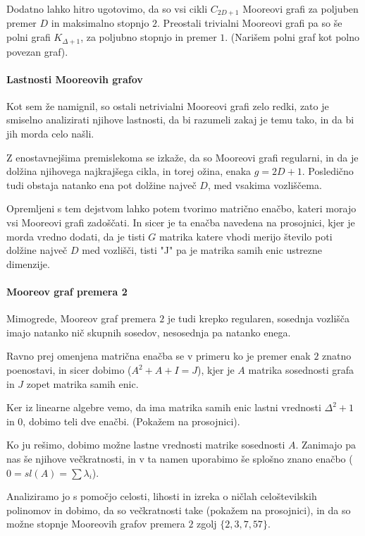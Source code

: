 \documentclass{fmfkpb}
\begin{document}
Dodatno lahko hitro ugotovimo, da so vsi cikli $C_{2D + 1}$ Mooreovi grafi 
za poljuben premer $D$ in maksimalno stopnjo $2$.
Preostali trivialni Mooreovi grafi pa so še polni grafi $K_{\Delta + 1}$, 
za poljubno stopnjo in premer $1$. (Narišem polni graf kot polno povezan graf).

\paragraph{Lastnosti Mooreovih grafov}
Kot sem že namignil, so ostali netrivialni Mooreovi grafi zelo redki, 
zato je smiselno analizirati njihove lastnosti, da bi razumeli zakaj je temu
tako, in da bi jih morda celo našli.

Z enostavnejšima premislekoma se izkaže, da so Mooreovi grafi regularni,
in da je dolžina njihovega najkrajšega cikla, in torej ožina, enaka $g=2D+1$.
Posledično tudi obstaja natanko ena pot dolžine največ $D$, med vsakima vozliščema.

Opremljeni s tem dejstvom lahko potem tvorimo matrično enačbo, kateri 
morajo vsi Mooreovi grafi zadoščati. In sicer je ta enačba navedena na prosojnici,
kjer je morda vredno dodati, da je tisti $G$ matrika katere 
vhodi merijo število poti dolžine največ $D$ med vozlišči, tisti "J" pa 
je matrika samih enic ustrezne dimenzije.

\paragraph{Mooreov graf premera 2}
Mimogrede, Mooreov graf premera $2$ je tudi krepko regularen, sosednja vozlišča imajo 
natanko nič skupnih sosedov, nesosednja pa natanko enega.

Ravno prej omenjena matrična enačba se v primeru ko je premer enak $2$ znatno
poenostavi, in sicer dobimo ($A^2 + A + I = J$), kjer je $A$ matrika 
sosednosti grafa in $J$ zopet matrika samih enic.

Ker iz linearne algebre vemo, da ima matrika samih enic lastni vrednosti
$\Delta^2 + 1$ in $0$, dobimo teli dve enačbi. (Pokažem na prosojnici).

Ko ju rešimo, dobimo možne lastne vrednosti matrike sosednosti $A$.
Zanimajo pa nas še njihove večkratnosti, in v ta namen uporabimo
še splošno znano enačbo ($0 = sl(A) = \sum\lambda_i$).

Analiziramo jo s pomočjo celosti, lihosti in izreka o ničlah 
celoštevilskih polinomov in dobimo, da so večkratnosti take (pokažem na prosojnici), 
in da so možne stopnje Mooreovih grafov premera $2$ zgolj $\{2, 3, 7, 57\}$.
\end{document}

